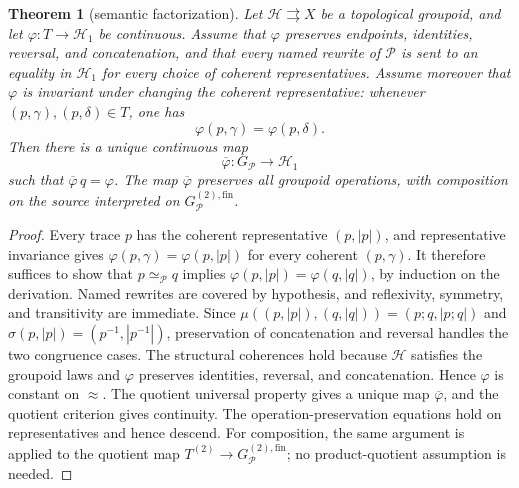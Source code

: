 \documentclass[10pt,reqno]{amsart}
\theoremstyle{definition}
\theoremstyle{plain}
\newtheorem{theorem}[definition]{Theorem}
\theoremstyle{remark}
\newcommand{\RwEq}{\mathrel{\simeq_{\!\mathcal P}}}
\newcommand{\Fin}{\mathrm{fin}}
\begin{document}
\begin{theorem}[semantic factorization]\label{thm:semantic-factorization}
Let $\mathcal H\rightrightarrows X$ be a topological groupoid, and let
$\varphi:T\to\mathcal H_1$ be continuous.  Assume that $\varphi$ preserves
endpoints, identities, reversal, and concatenation, and that every named
rewrite of $\mathcal P$ is sent to an equality in $\mathcal H_1$ for every
choice of coherent representatives.  Assume moreover that $\varphi$ is
invariant under changing the coherent representative: whenever
$(p,\gamma),(p,\delta)\in T$, one has
\[
  \varphi(p,\gamma)=\varphi(p,\delta).
\]
Then there is a unique continuous map
\[
  \overline{\varphi}:G_{\mathcal P}\longrightarrow\mathcal H_1
\]
such that $\overline{\varphi}\,q=\varphi$.  The map
$\overline{\varphi}$ preserves all groupoid operations, with composition on
the source interpreted on $G_{\mathcal P}^{(2),\Fin}$.
\end{theorem}

\begin{proof}
Every trace $p$ has the coherent representative $(p,|p|)$, and representative
invariance gives $\varphi(p,\gamma)=\varphi(p,|p|)$ for every coherent
$(p,\gamma)$.  It therefore suffices to show that $p\RwEq q$ implies
$\varphi(p,|p|)=\varphi(q,|q|)$, by induction on the derivation.  Named
rewrites are covered by hypothesis, and reflexivity, symmetry, and
transitivity are immediate.  Since
$\mu((p,|p|),(q,|q|))=(p;q,|p;q|)$ and $\sigma(p,|p|)=(p^{-1},|p^{-1}|)$,
preservation of concatenation and reversal handles the two congruence cases.
The structural coherences hold because $\mathcal H$ satisfies the groupoid
laws and $\varphi$ preserves identities, reversal, and concatenation.  Hence
$\varphi$ is constant on $\approx$.  The quotient universal property gives a unique map
$\overline{\varphi}$, and the quotient criterion gives continuity.  The
operation-preservation equations hold on representatives and hence descend.
For composition, the same argument is applied to the quotient map
$T^{(2)}\to G_{\mathcal P}^{(2),\Fin}$; no product-quotient assumption is
needed.
\end{proof}
\end{document}
